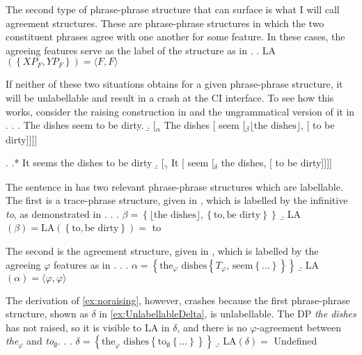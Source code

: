 \documentclass[MilwayThesis]{subfiles}
\begin{document}
The second type of phrase-phrase structure that can surface is what I will call agreement structures.
These are phrase-phrase structures in which the two constituent phrases agree with one another for some feature.
In these cases, the agreeing features serve as the label of the structure as in \Next.
\ex. LA$(\left\{ XP_F, YP_F \right\}) = \langle F,F\rangle$

If neither of these two situations obtains for a given phrase-phrase structure, it will be unlabellable and result in a crash at the CI interface.
To see how this works, consider the raising construction in \Next and the ungrammatical version of it in \NNext.
\ex.\label{ex:raising}
\a. The dishes seem to be dirty.
\b. [$_\alpha$ The dishes [ seem [$_\beta \lfloor\text{the dishes}\rfloor$, [ to be dirty]]]]

\ex.\label{ex:noraising}
\a.* It seems the dishes to be dirty
\b. [$_\gamma$ It [ seem [$_\delta$ the dishes, [ to be dirty]]]]

The sentence in \LLast has two relevant phrase-phrase structures which are labellable.
The first is a trace-phrase structure, given in \Next[a], which is labelled by the infinitive \textit{to}, as demonstrated in \Next[b].
\ex.
\a.  $\beta = \left\{ \lfloor\text{the dishes}\rfloor, \left\{ \text{to}, \text{be dirty} \right\} \right\}$
\b. LA$(\beta) = \text{LA}(\left\{ \text{to}, \text{be dirty} \right\}) =$ to

The second is the agreement structure, given in \Next[b], which is labelled by the agreeing $\varphi$ features as in \Next[b].
\ex.
\a. $\alpha = \left\{ \text{the}_\varphi \text{ dishes} \left\{ T_\varphi \text{, seem} \left\{ \ldots \right\} \right\} \right\}$
\b. LA$(\alpha) = \langle\varphi, \varphi\rangle$

The derivation of \ref{ex:noraising}, however, crashes because the first phrase-phrase structure, shown as $\delta$ in \cref{ex:UnlabellableDelta}, is unlabellable.
The DP \textit{the dishes} has not raised, so it is visible to LA in $\delta$, and there is no $\varphi$-agreement between \textit{the}$_\varphi$ and \textit{to}$_\emptyset$.
\ex.\label{ex:UnlabellableDelta}
\a. $\delta = \left\{ \text{the}_\varphi \text{ dishes} \left\{ \text{to}_\emptyset \left\{ \ldots \right\}\right\} \right\}$
\b. LA$(\delta) = $ Undefined
\end{document}
